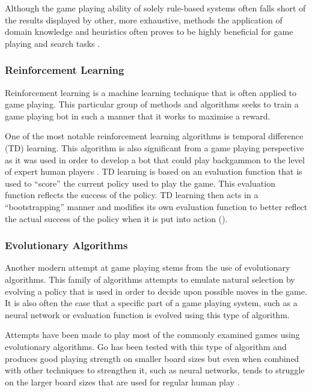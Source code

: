 \documentclass[]{article}
\begin{document}
\par Although the game playing ability of solely rule-based systems often falls short of the results displayed by other, more exhaustive, methods the application of domain knowledge and heuristics often proves to be highly beneficial for game playing and search tasks \autocite{pearl1984heuristics}.

\subsubsection{Reinforcement Learning}

Reinforcement learning is a machine learning technique that is often applied to game playing. This particular group of methods and algorithms seeks to train a game playing bot in such a manner that it works to maximise a reward. 

\par One of the most notable reinforcement learning algorithms is temporal difference (TD) learning. This algorithm is also significant from a game playing perspective as it was used in order to develop a bot that could play backgammon to the level of expert human players \autocite{tesauro1995temporal}. TD learning is based on an evaluation function that is used to ``score'' the current policy used to play the game. This evaluation function reflects the success of the policy. TD learning then acts in a ``bootstrapping'' manner and modifies its own evaluation function to better reflect the actual success of the policy when it is put into action (\citeauthor{kunzintroduction}).


\subsubsection{Evolutionary Algorithms}
Another modern attempt at game playing stems from the use of evolutionary algorithms. This family of algorithms attempts to emulate natural selection by evolving a policy that is used in order to decide upon possible moves in the game. It is also often the case that a specific part of a game playing system, such as a neural network or evaluation function is evolved using this type of algorithm.

\par Attempts have been made to play most of the commonly examined games using evolutionary algorithms. Go has been tested with this type of algorithm and produces good playing strength on smaller board sizes but even when combined with other techniques to strengthen it, such as neural networks, tends to struggle on the larger board sizes that are used for regular human play \autocite{richards1998evolving,kojima1997evolutionary}.
\end{document}
